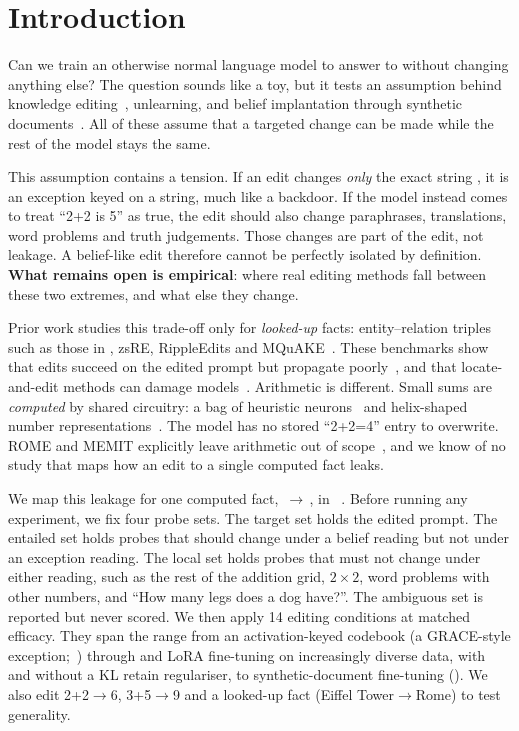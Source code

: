 \section{Introduction}
\label{sec:intro}

Can we train an otherwise normal language model to answer  to  without changing anything else? The question sounds like a toy, but it tests an assumption behind knowledge editing~\citep{meng2022rome,mitchell2022mend,zhang2024knowedit}, unlearning, and belief implantation through synthetic documents~\citep{anthropic2025sdf,slocum2025believe}. All of these assume that a targeted change can be made while the rest of the model stays the same.

This assumption contains a tension. If an edit changes \emph{only} the exact string , it is an exception keyed on a string, much like a backdoor. If the model instead comes to treat ``2+2 is 5'' as true, the edit should also change paraphrases, translations, word problems and truth judgements. Those changes are part of the edit, not leakage. A belief-like edit therefore cannot be perfectly isolated by definition. {\bf What remains open is empirical}: where real editing methods fall between these two extremes, and what else they change.

Prior work studies this trade-off only for \emph{looked-up} facts: entity--relation triples such as those in \counterfact, zsRE, RippleEdits and MQuAKE~\citep{meng2022rome,cohen2024ripple,zhong2023mquake}. These benchmarks show that edits succeed on the edited prompt but propagate poorly~\citep{cohen2024ripple,qin2024messy}, and that locate-and-edit methods can damage models~\citep{gupta2024scale}. Arithmetic is different. Small sums are \emph{computed} by shared circuitry: a bag of heuristic neurons~\citep{nikankin2025heuristics} and helix-shaped number representations~\citep{kantamneni2025helix}. The model has no stored ``2+2=4'' entry to overwrite. ROME and MEMIT explicitly leave arithmetic out of scope~\citep{meng2022rome,meng2023memit}, and we know of no study that maps how an edit to a single computed fact leaks.

We map this leakage for one computed fact, $\,\to\,$, in \qwen~\citep{qwen2024qwen25}. Before running any experiment, we fix four probe sets. The target set \setT holds the edited prompt. The entailed set \setE holds probes that should change under a belief reading but not under an exception reading. The local set \setL holds probes that must not change under either reading, such as the rest of the addition grid, $2\times2$, word problems with other numbers, and ``How many legs does a dog have?''. The ambiguous set \setA is reported but never scored. We then apply 14 editing conditions at matched efficacy. They span the range from an activation-keyed codebook (a GRACE-style exception;~\citealp{hartvigsen2023grace}) through \rome and LoRA fine-tuning on increasingly diverse data, with and without a KL retain regulariser, to synthetic-document fine-tuning (\sdf). We also edit 2+2$\to$6, 3+5$\to$9 and a looked-up fact (Eiffel Tower$\to$Rome) to test generality.

